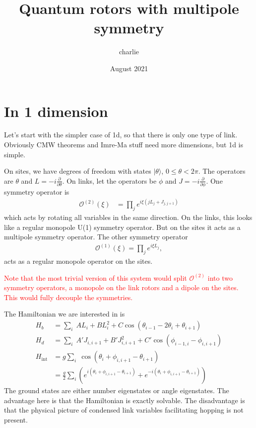 \documentclass[12pt]{article}
\title{Quantum rotors with multipole symmetry}
\author{charlie}
\date{August 2021}
\newcommand{\note}[1]{\textcolor{red}{#1}}
\newcommand{\nn}{\nonumber\\}
\renewcommand{\int}{\text{int}}
\newcommand{\op}[1]{\mathcal{O}^{(#1)}}
\begin{document}
\maketitle

\section{In 1 dimension}

Let's start with the simpler case of 1d, so that there is only one type of link. Obviously CMW theorems and Imre-Ma stuff need more dimensions, but 1d is simple.

On sites, we have degrees of freedom with states $|\theta\rangle$, $0\le \theta<2\pi$. The operators are $\theta$ and $L = -i\frac{\partial}{\partial\theta}$. On links, let the operators be $\phi$ and $J = -i\frac{\partial}{\partial\phi}$. One symmetry operator is 
\begin{align}
\mathcal{O}^{(2)}(\xi) &= \prod_j e^{i \xi( jL_j + J_{j, j+1} )}
\end{align}
which acts by rotating all variables in the same direction. On the links, this looks like a regular monopole U(1) symmetry operator. But on the sites it acts as a multipole symmetry operator. The other symmetry operator
\begin{align}
\mathcal{O}^{(1)}(\xi) = \prod_j e^{i \xi L_j},
\end{align}
acts as a regular monopole operator on the sites.

\note{Note that the most trivial version of this system would split $\op{2}$ into two symmetry operators, a monopole on the link rotors and a dipole on the sites. This would fully decouple the symmetries.}

The Hamiltonian we are interested in is 
\begin{align}
H_b &= \sum_i \; A  L_i + B L_i^2 + C \cos \left( \theta_{i-1} - 2\theta_i+\theta_{i+1} \right)\nn
H_d &= \sum_i \; A' J_{i,i+1} + B' J_{i,i+1}^2 + C' \cos \left( \phi_{i-1,i}-\phi_{i,i+1} \right) \nn
H_{\int} &= g \sum_i \; \cos \left( \theta_{i}+\phi_{i,i+1} - \theta_{i+1} \right) \nn
&= \frac{g}{2}\sum_i\left( e^{i\left( \theta_{i}+\phi_{i,i+1} - \theta_{i+1} \right)} + e^{-i\left( \theta_{i}+\phi_{i,i+1} - \theta_{i+1} \right) } \right)
\end{align}
The ground states are either number eigenstates or angle eigenstates. The advantage here is that the Hamiltonian is exactly solvable. The disadvantage is that the physical picture of condensed link variables facilitating hopping is not present.
\end{document}
